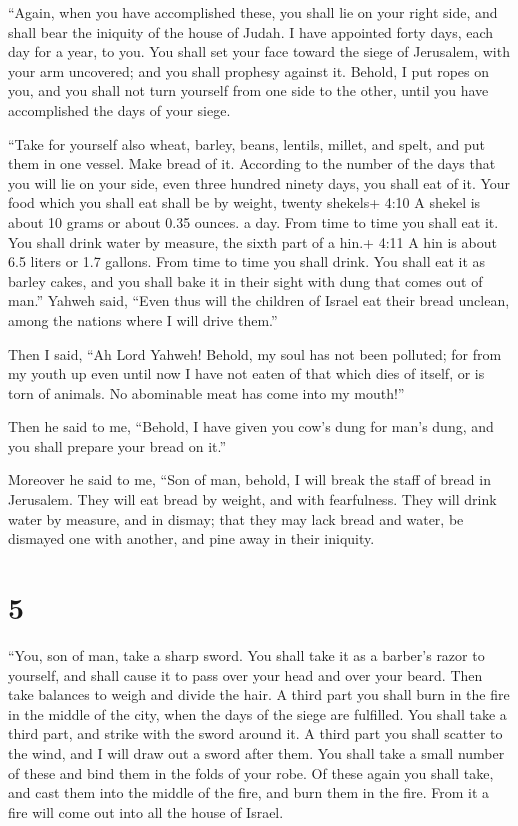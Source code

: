  ``Again, when you have accomplished these, you shall lie on
your right side, and shall bear the iniquity of the house of Judah. I
have appointed forty days, each day for a year, to you.  You
shall set your face toward the siege of Jerusalem, with your arm
uncovered; and you shall prophesy against it.  Behold, I put
ropes on you, and you shall not turn yourself from one side to the
other, until you have accomplished the days of your siege.

 ``Take for yourself also wheat, barley, beans, lentils,
millet, and spelt, and put them in one vessel. Make bread of it.
According to the number of the days that you will lie on your side, even
three hundred ninety days, you shall eat of it.  Your food
which you shall eat shall be by weight, twenty shekels+ 4:10 A shekel is
about 10 grams or about 0.35 ounces. a day. From time to time you shall
eat it.  You shall drink water by measure, the sixth part
of a hin.+ 4:11 A hin is about 6.5 liters or 1.7 gallons. From time to
time you shall drink.  You shall eat it as barley cakes,
and you shall bake it in their sight with dung that comes out of man.''
 Yahweh said, ``Even thus will the children of Israel eat
their bread unclean, among the nations where I will drive them.''

 Then I said, ``Ah Lord Yahweh! Behold, my soul has not
been polluted; for from my youth up even until now I have not eaten of
that which dies of itself, or is torn of animals. No abominable meat has
come into my mouth!''

 Then he said to me, ``Behold, I have given you cow's dung
for man's dung, and you shall prepare your bread on it.''

 Moreover he said to me, ``Son of man, behold, I will break
the staff of bread in Jerusalem. They will eat bread by weight, and with
fearfulness. They will drink water by measure, and in dismay;
 that they may lack bread and water, be dismayed one with
another, and pine away in their iniquity.

\hypertarget{section-4}{%
\section{5}\label{section-4}}

 ``You, son of man, take a sharp sword. You shall take it as
a barber's razor to yourself, and shall cause it to pass over your head
and over your beard. Then take balances to weigh and divide the hair.
 A third part you shall burn in the fire in the middle of
the city, when the days of the siege are fulfilled. You shall take a
third part, and strike with the sword around it. A third part you shall
scatter to the wind, and I will draw out a sword after them.
 You shall take a small number of these and bind them in the
folds of your robe.  Of these again you shall take, and cast
them into the middle of the fire, and burn them in the fire. From it a
fire will come out into all the house of Israel.

